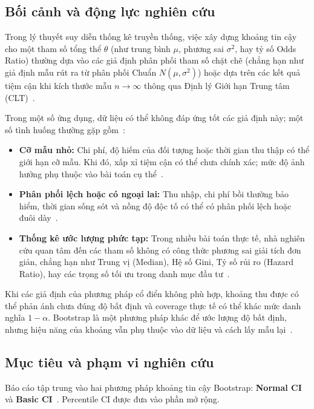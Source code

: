 \documentclass[12pt,a4paper]{article}
\theoremstyle{definition}
\numberwithin{equation}{section}
\begin{document}
	\subsection{Bối cảnh và động lực nghiên cứu}
	Trong lý thuyết suy diễn thống kê truyền thống, việc xây dựng khoảng tin cậy cho một tham số tổng thể $\theta$ (như trung bình $\mu$, phương sai $\sigma^2$, hay tỷ số Odds Ratio) thường dựa vào các giả định phân phối tham số chặt chẽ (chẳng hạn như giả định mẫu rút ra từ phân phối Chuẩn $N(\mu, \sigma^2)$) hoặc dựa trên các kết quả tiệm cận khi kích thước mẫu $n \to \infty$ thông qua Định lý Giới hạn Trung tâm (CLT)~\cite{buithuytrang2026,rizzo2019,quyen2025}.

	Trong một số ứng dụng, dữ liệu có thể không đáp ứng tốt các giả định này; một số tình huống thường gặp gồm~\cite[tr. 11--14, 258--261]{efron1993}:
	\begin{itemize}
		\item \textbf{Cỡ mẫu nhỏ:} Chi phí, độ hiếm của đối tượng hoặc thời gian thu thập có thể giới hạn cỡ mẫu. Khi đó, xấp xỉ tiệm cận có thể chưa chính xác; mức độ ảnh hưởng phụ thuộc vào bài toán cụ thể~\cite[tr. 258--261]{efron1993}.
		\item \textbf{Phân phối lệch hoặc có ngoại lai:} Thu nhập, chi phí bồi thường bảo hiểm, thời gian sống sót và nồng độ độc tố có thể có phân phối lệch hoặc đuôi dày~\cite[tr. 11--15]{davison1997}.
		\item \textbf{Thống kê ước lượng phức tạp:} Trong nhiều bài toán thực tế, nhà nghiên cứu quan tâm đến các tham số không có công thức phương sai giải tích đơn giản, chẳng hạn như Trung vị (Median), Hệ số Gini, Tỷ số rủi ro (Hazard Ratio), hay các trọng số tối ưu trong danh mục đầu tư~\cite[tr. 14--16, 38--41]{efron1993}.
	\end{itemize}

	Khi các giả định của phương pháp cổ điển không phù hợp, khoảng thu được có thể phản ánh chưa đúng độ bất định và coverage thực tế có thể khác mức danh nghĩa $1-\alpha$. Bootstrap là một phương pháp khác để ước lượng độ bất định, nhưng hiệu năng của khoảng vẫn phụ thuộc vào dữ liệu và cách lấy mẫu lại~\cite{efron1979,davison1997}.

	\subsection{Mục tiêu và phạm vi nghiên cứu}
	Báo cáo tập trung vào hai phương pháp khoảng tin cậy Bootstrap: \textbf{Normal CI} và \textbf{Basic CI}~\cite{buithuytrang2026,rizzo2019}. Percentile CI được đưa vào phần mở rộng.
\end{document}
